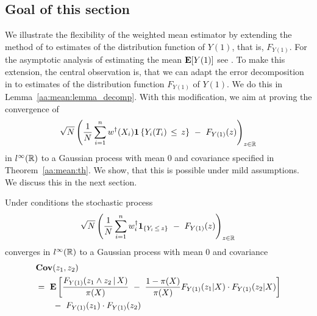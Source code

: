 \subsection*{Goal of this section}
We illustrate the flexibility of 
the weighted mean estimator by 
extending the method of \cite{Wang2019} to
estimates of 
the distribution function of $Y(1)$, that is, $F_{Y(1)}$.
For the asymptotic analysis of estimating the mean $\mathbf{E}[Y(1)]$ see \cite[Proof of Theorem~3]{Wang2019}.
To make this extension, the central observation is, that we can adapt the error decomposition in \cite[page 27]{Wang2019} 
to estimates of the distribution function $F_{Y(1)}$ of $Y(1)$.
We do this in Lemma~\ref{aa:mean:lemma_decomp}.
With this modification, we aim at proving
the convergence of
\begin{gather}
    \sqrt{N}
    \left( 
  \frac{1}{N}
    \sum_{i=1}^{n} 
    w^\dagger(X_i)
    \mathbf{1}\left\{ Y_i(T_i)\,\le\, z \right\}
    \ 
    -
    \ 
    F_{Y(1)}(z)
    \right)
    _{z\in\R}
    \,
  \end{gather}
  in
  $l^\infty(\mathbb{R})$
  to a Gaussian process with mean 0 and covariance specified in Theorem~\ref{aa:mean:th}.
  We show, that this is possible under mild assumptions.
  We discuss this in the next section.
\begin{ftheorem}
  \label{aa:mean:th}
  Under conditions 
the stochastic process
\begin{gather}
    \sqrt{N}
    \left( 
  \frac{1}{N}
    \sum_{i=1}^{n} 
    w_i^\dagger
    \mathbf{1}
    _{\left\{ Y_i\,\le\, z \right\}}
    \ 
    -
    \ 
    F_{Y(1)}(z)
    \right)
    _{z\in\R}
    \,
  \end{gather}
  converges in
  $l^\infty(\mathbb{R})$
  to a Gaussian process with mean 0 and covariance
\begin{align}
  \label{cov:lp}
 \begin{split}
  &
  \mathbf{Cov}
  (z_1,z_2)
  \\
  &
  =\ 
  \E
  \left[ 
 \frac{
 F_{Y(1)}(z_1 \land z_2\,|\,X)
}{\pi(X)}
\ 
-
\ 
 \frac{1-\pi(X)}{\pi(X)}
 F_{Y(1)}(z_1|X)
 \cdot
 F_{Y(1)}(z_2|X)
  \right]
  \\
  &
  \qquad 
 -
 \ 
 F_{Y(1)}(z_1)
 \cdot
 F_{Y(1)}(z_2)
 \end{split}
\end{align}
\end{ftheorem}

